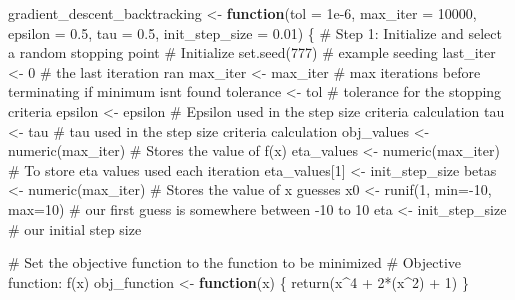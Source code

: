 \documentclass[
  letterpaper,
  DIV=11,
  numbers=noendperiod]{scrartcl}
\newenvironment{Shaded}{\begin{snugshade}}{\end{snugshade}}
\newcommand{\AttributeTok}[1]{\textcolor[rgb]{0.40,0.45,0.13}{#1}}
\newcommand{\CommentTok}[1]{\textcolor[rgb]{0.37,0.37,0.37}{#1}}
\newcommand{\ControlFlowTok}[1]{\textcolor[rgb]{0.00,0.23,0.31}{\textbf{#1}}}
\newcommand{\DecValTok}[1]{\textcolor[rgb]{0.68,0.00,0.00}{#1}}
\newcommand{\FloatTok}[1]{\textcolor[rgb]{0.68,0.00,0.00}{#1}}
\newcommand{\FunctionTok}[1]{\textcolor[rgb]{0.28,0.35,0.67}{#1}}
\newcommand{\NormalTok}[1]{\textcolor[rgb]{0.00,0.23,0.31}{#1}}
\newcommand{\OtherTok}[1]{\textcolor[rgb]{0.00,0.23,0.31}{#1}}
\newcommand{\SpecialCharTok}[1]{\textcolor[rgb]{0.37,0.37,0.37}{#1}}
\begin{document}
\begin{Shaded}
\begin{Highlighting}[]
\NormalTok{gradient\_descent\_backtracking }\OtherTok{\textless{}{-}} \ControlFlowTok{function}\NormalTok{(}\AttributeTok{tol =} \FloatTok{1e{-}6}\NormalTok{, }\AttributeTok{max\_iter =} \DecValTok{10000}\NormalTok{, }\AttributeTok{epsilon =} \FloatTok{0.5}\NormalTok{, }\AttributeTok{tau =} \FloatTok{0.5}\NormalTok{, }\AttributeTok{init\_step\_size =} \FloatTok{0.01}\NormalTok{) \{}
  \CommentTok{\# Step 1: Initialize and select a random stopping point}
  \CommentTok{\# Initialize}
  \FunctionTok{set.seed}\NormalTok{(}\DecValTok{777}\NormalTok{) }\CommentTok{\# example seeding }
\NormalTok{  last\_iter }\OtherTok{\textless{}{-}} \DecValTok{0} \CommentTok{\# the last iteration ran}
\NormalTok{  max\_iter }\OtherTok{\textless{}{-}}\NormalTok{ max\_iter }\CommentTok{\# max iterations before terminating if minimum isn\textquotesingle{}t found}
\NormalTok{  tolerance }\OtherTok{\textless{}{-}}\NormalTok{ tol }\CommentTok{\# tolerance for the stopping criteria }
\NormalTok{  epsilon }\OtherTok{\textless{}{-}}\NormalTok{ epsilon }\CommentTok{\# Epsilon used in the step size criteria calculation}
\NormalTok{  tau }\OtherTok{\textless{}{-}}\NormalTok{ tau }\CommentTok{\# tau used in the step size criteria calculation}
\NormalTok{  obj\_values }\OtherTok{\textless{}{-}} \FunctionTok{numeric}\NormalTok{(max\_iter) }\CommentTok{\# Stores the value of f(x)}
\NormalTok{  eta\_values }\OtherTok{\textless{}{-}} \FunctionTok{numeric}\NormalTok{(max\_iter)  }\CommentTok{\# To store eta values used each iteration}
\NormalTok{  eta\_values[}\DecValTok{1}\NormalTok{] }\OtherTok{\textless{}{-}}\NormalTok{ init\_step\_size}
\NormalTok{  betas }\OtherTok{\textless{}{-}} \FunctionTok{numeric}\NormalTok{(max\_iter) }\CommentTok{\# Stores the value of x guesses}
\NormalTok{  x0 }\OtherTok{\textless{}{-}} \FunctionTok{runif}\NormalTok{(}\DecValTok{1}\NormalTok{, }\AttributeTok{min=}\SpecialCharTok{{-}}\DecValTok{10}\NormalTok{, }\AttributeTok{max=}\DecValTok{10}\NormalTok{) }\CommentTok{\# our first guess is somewhere between {-}10 to 10}
\NormalTok{  eta }\OtherTok{\textless{}{-}}\NormalTok{ init\_step\_size }\CommentTok{\# our initial step size}
  
  \CommentTok{\# Set the objective function to the function to be minimized }
  \CommentTok{\# Objective function: f(x)}
\NormalTok{  obj\_function }\OtherTok{\textless{}{-}} \ControlFlowTok{function}\NormalTok{(x) \{}
    \FunctionTok{return}\NormalTok{(x}\SpecialCharTok{\^{}}\DecValTok{4} \SpecialCharTok{+} \DecValTok{2}\SpecialCharTok{*}\NormalTok{(x}\SpecialCharTok{\^{}}\DecValTok{2}\NormalTok{) }\SpecialCharTok{+} \DecValTok{1}\NormalTok{) }
\NormalTok{  \}}
  

\end{Highlighting}
\end{Shaded}
\end{document}
